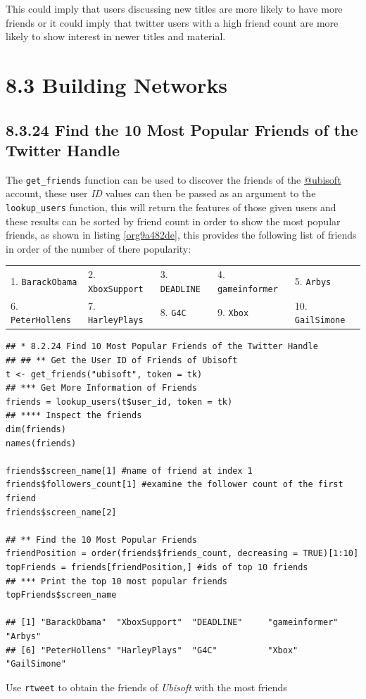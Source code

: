 \documentclass[11pt]{article}
\begin{document}
This could imply that users discussing new titles are more likely to have more friends or it could imply that twitter users with a high friend count are more likely to show interest in newer titles and material.
\section{8.3 Building Networks}
\label{sec:org5f8c55a}
\subsection{8.3.24 Find the 10 Most Popular Friends of the Twitter Handle}
\label{sec:orgb4c1a72}
The \texttt{get\_friends} function can be used to discover the friends of the \href{https://twitter.com/Ubisoft}{@ubisoft} account, these user \emph{ID} values can then be passed as an argument to the \texttt{lookup\_users} function, this will return the features of those given users and these results can be sorted by friend count in order to show the most popular friends, as shown in listing \ref{org9a482de}, this provides the following list of friends in order of the number of there popularity:


\begin{center}
\begin{tabular}{lllll}
1. \texttt{BarackObama} & 2.  \texttt{XboxSupport} & 3. \texttt{DEADLINE} & 4.  \texttt{gameinformer} & 5.  \texttt{Arbys}\\
6.  \texttt{PeterHollens} & 7.  \texttt{HarleyPlays} & 8. \texttt{G4C} & 9.  \texttt{Xbox} & 10. \texttt{GailSimone}\\
\end{tabular}
\end{center}


\begin{listing}[htbp]
\begin{verbatim}
## * 8.2.24 Find 10 Most Popular Friends of the Twitter Handle
## ## ** Get the User ID of Friends of Ubisoft
t <- get_friends("ubisoft", token = tk)
## *** Get More Information of Friends
friends = lookup_users(t$user_id, token = tk)
## **** Inspect the friends
dim(friends)
names(friends)

friends$screen_name[1] #name of friend at index 1
friends$followers_count[1] #examine the follower count of the first friend
friends$screen_name[2]

## ** Find the 10 Most Popular Friends
friendPosition = order(friends$friends_count, decreasing = TRUE)[1:10]
topFriends = friends[friendPosition,] #ids of top 10 friends
## *** Print the top 10 most popular friends
topFriends$screen_name

## [1] "BarackObama"  "XboxSupport"  "DEADLINE"     "gameinformer" "Arbys"
## [6] "PeterHollens" "HarleyPlays"  "G4C"          "Xbox"         "GailSimone"
\end{verbatim}
\caption{\label{org9a482de}Use \texttt{rtweet} to obtain the friends of \emph{Ubisoft} with the most friends}
\end{listing}
\end{document}
